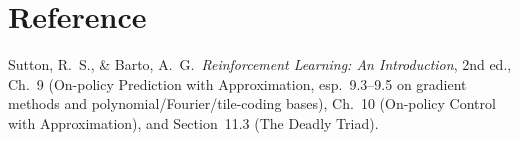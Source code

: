 \documentclass[11pt]{article}
\begin{document}
\section{Reference}

Sutton, R.\ S., \& Barto, A.\ G.\ \emph{Reinforcement Learning: An
Introduction}, 2nd ed., Ch.~9 (On-policy Prediction with Approximation,
esp.\ 9.3--9.5 on gradient methods and polynomial/Fourier/tile-coding
bases), Ch.~10 (On-policy Control with Approximation), and
Section~11.3 (The Deadly Triad).
\end{document}
